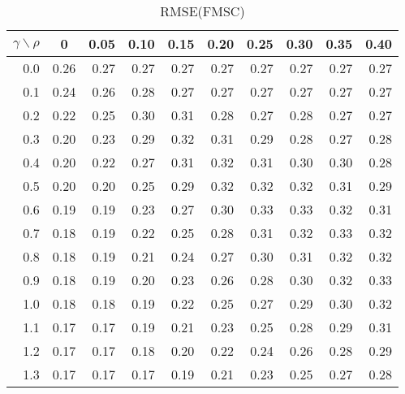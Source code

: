 \documentclass[12pt]{article}
\begin{document}
%
\begin{table}[!tbp]
\caption{RMSE(FMSC)}
 \begin{center}
 \begin{tabular}{r|rrrrrrrrr}\hline\hline
\multicolumn{1}{c|}{$\gamma\backslash\rho$}&\multicolumn{1}{c}{0}&\multicolumn{1}{c}{0.05}&\multicolumn{1}{c}{0.10}&\multicolumn{1}{c}{0.15}&\multicolumn{1}{c}{0.20}&\multicolumn{1}{c}{0.25}&\multicolumn{1}{c}{0.30}&\multicolumn{1}{c}{0.35}&\multicolumn{1}{c}{0.40}\tabularnewline
\hline
0.0&0.26&0.27&0.27&0.27&0.27&0.27&0.27&0.27&0.27\tabularnewline
0.1&0.24&0.26&0.28&0.27&0.27&0.27&0.27&0.27&0.27\tabularnewline
0.2&0.22&0.25&0.30&0.31&0.28&0.27&0.28&0.27&0.27\tabularnewline
0.3&0.20&0.23&0.29&0.32&0.31&0.29&0.28&0.27&0.28\tabularnewline
0.4&0.20&0.22&0.27&0.31&0.32&0.31&0.30&0.30&0.28\tabularnewline
0.5&0.20&0.20&0.25&0.29&0.32&0.32&0.32&0.31&0.29\tabularnewline
0.6&0.19&0.19&0.23&0.27&0.30&0.33&0.33&0.32&0.31\tabularnewline
0.7&0.18&0.19&0.22&0.25&0.28&0.31&0.32&0.33&0.32\tabularnewline
0.8&0.18&0.19&0.21&0.24&0.27&0.30&0.31&0.32&0.32\tabularnewline
0.9&0.18&0.19&0.20&0.23&0.26&0.28&0.30&0.32&0.33\tabularnewline
1.0&0.18&0.18&0.19&0.22&0.25&0.27&0.29&0.30&0.32\tabularnewline
1.1&0.17&0.17&0.19&0.21&0.23&0.25&0.28&0.29&0.31\tabularnewline
1.2&0.17&0.17&0.18&0.20&0.22&0.24&0.26&0.28&0.29\tabularnewline
1.3&0.17&0.17&0.17&0.19&0.21&0.23&0.25&0.27&0.28\tabularnewline
\hline
\end{tabular}

\end{center}

\end{table}
\end{document}
